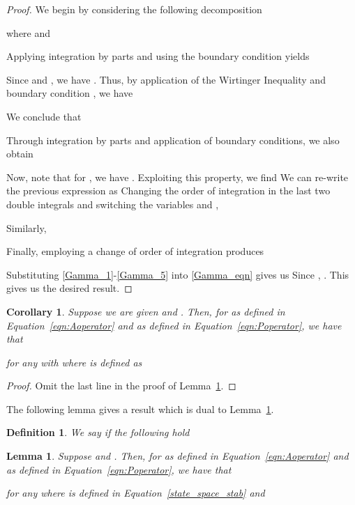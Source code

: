 \documentclass[9pt,journal,twocolumn]{IEEEtran}
\newtheorem{definition}{Definition}
\newtheorem{lemma}{Lemma}
\newtheorem{corollary}{Corollary}
\begin{document}
\begin{proof}
We begin by considering the following decomposition

 where
   and
 
 Applying integration by parts and using the boundary condition  yields
 

 Since  and , we have . Thus, by application of the Wirtinger Inequality and boundary condition , we have
 
We conclude that
 
Through integration by parts and application of boundary conditions, we also obtain
 
Now, note that for , we have . Exploiting this property, we find 
 We can re-write the previous expression as
  Changing the order of integration in the last two double integrals and switching the variables  and ,
 
 
 Similarly,
  
Finally, employing a change of order of integration produces
 
 Substituting \eqref{Gamma_1}-\eqref{Gamma_5} into \eqref{Gamma_eqn} gives us
  Since , . This gives us the desired result.
 \end{proof}

\begin{corollary}\label{cor:primal2}
Suppose we are given   and . Then, for  as defined in Equation~\eqref{eqn:Aoperator} and  as defined in Equation~\eqref{eqn:Poperator}, we have that
 
for any  with  where  is defined as

\end{corollary}
\begin{proof}
Omit the last line in the proof of Lemma~\ref{cor:primal2}.
\end{proof}

The following lemma gives a result which is dual to Lemma~\ref{lem:dual}.

\begin{definition}
We say  if the following hold

\end{definition}


\begin{lemma}\label{lem:dual}
Suppose  and . Then, for  as defined in Equation~\eqref{eqn:Aoperator} and  as defined in Equation~\eqref{eqn:Poperator}, we have that

for any  where  is defined in Equation~\eqref{state_space_stab} and

\end{lemma}
\end{document}
